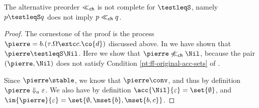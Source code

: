 
\begin{counterexample}
  \label{ex:ffCH98-incomplete}
  The alternative preorder $\ll_{{\sf ch}}$
  is not complete for $\testleqS$, namely $p \testleqS q$ does not imply $p \ll_{{\sf ch}} q$.
\begin{proof}
  The cornestone %
  of the proof is the process
 $\pierre = b.(\tau.\Omega \extc c. \co{d} )$ discussed above.
In  we have shown that $\pierre \testleqS \Nil$.
Here we show that $\pierre \not\llch \Nil$, because the pair $(\pierre,\Nil)$ does not
satisfy Condition \ref{pt:ff-original-acc-sets} of .

Since $\pierre \stable$, we know that $\pierre \conv$, and thus by
definition $\pierre \acnvalong \varepsilon$. We also
have by definition $\acc{\Nil}{\varepsilon} = \set{ \emptyset }$, and
$\im{\pierre}{\varepsilon} = \set{\emptyset, \mset{ b}, \mset{ b, c
  }}$.



\end{proof}
\end{counterexample}
